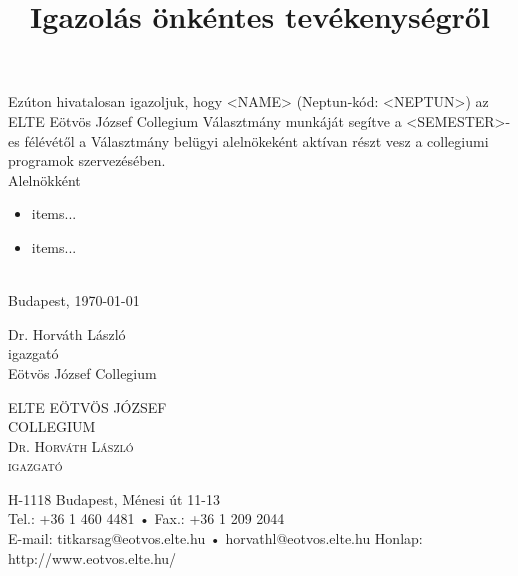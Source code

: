 \documentclass[12pt,a4paper]{article}
\title{Igazolás önkéntes tevékenységről\vspace{-1.0cm}}
\date{}
\author{}
\makeatletter
\newcommand\Footer{

	{\footnotesize 
	\begin{minipage}[t]{0.4\textwidth}
		\begin{flushright}
		\textsc{{\color{darkblue} 
			ELTE EÖTVÖS JÓZSEF\\
			COLLEGIUM}\\
		    {\scriptsize 
		    Dr. Horváth László\\
			igazgató\\
            }}
		\end{flushright}
	\end{minipage}
	\hspace{1em}
	\begin{minipage}[t]{0.45\textwidth}
		\begin{flushleft}
			{\scriptsize H-1118 Budapest, Ménesi út 11-13\\
			Tel.: +36 1 460 4481 • Fax.: +36 1 209 2044\\
			E-mail:	titkarsag@eotvos.elte.hu • horvathl@eotvos.elte.hu
			Honlap: http://www.eotvos.elte.hu/ }
		\end{flushleft}
	\end{minipage}
	}
}
\newcommand{\signiture}[3]{
\begin{center}
	#1\\
	#2\\
	#3
\end{center}
}
\makeatother
\begin{document}
\maketitle

Ezúton hivatalosan igazoljuk, hogy <NAME> (Neptun-kód: <NEPTUN>) az ELTE Eötvös József Collegium Választmány munkáját segítve a <SEMESTER>-es félévétől a Választmány belügyi alelnökeként aktívan részt vesz a collegiumi programok szervezésében.\\
\leavevmode\smallskip
Alelnökként
\begin{itemize}
	\itemsep0em 
	\item items...
	\item items...
\end{itemize}


\leavevmode\\
Budapest, \today
\vspace{5em}



\begin{flushright}
\begin{minipage}[t]{0.4\textwidth}
	\signiture{Dr. Horváth László}{igazgató}{Eötvös József Collegium}
\end{minipage}
\end{flushright}

\vfill

\begin{center}
	\Footer
\end{center}
\end{document}
